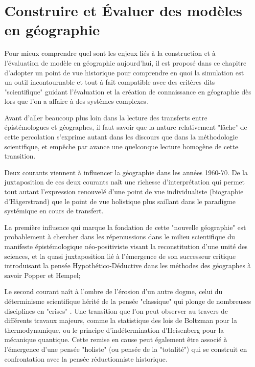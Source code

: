 


\chapter{Construire et Évaluer des modèles en géographie}

\startcontents[chapters]
\Mprintcontents

Pour mieux comprendre quel sont les enjeux liés à la construction et à l'évaluation de modèle en géographie aujourd'hui, il est proposé dans ce chapitre d'adopter un point de vue historique pour comprendre en quoi la simulation est un outil incontournable et tout à fait compatible avec des critères dits "scientifique" guidant l'évaluation et la création de connaissance en géographie dès lors que l'on a affaire à des systèmes complexes.

Avant d'aller beaucoup plus loin dans la lecture des transferts entre épistémologues et géographes, il faut savoir que la nature relativement "lâche" de cette percolation s'exprime autant dans les discours que dans la méthodologie scientifique, et empêche par avance une quelconque lecture homogène de cette transition.

Deux courants viennent à influencer la géographie dans les années 1960-70. De la juxtaposition de ces deux courants naît une richesse d’interprétation qui permet tout autant l'expression renouvelé d'une point de vue individualiste (biographie d'Hägerstrand) que le point de vue holistique plus saillant dans le paradigme systémique en cours de transfert. 

La première influence qui marque la fondation de cette "nouvelle géographie" est probablement à chercher dans les répercussions dans le milieu scientifique du manifeste épistémologique néo-positiviste visant la reconstitution d'une unité des sciences, et la quasi juxtaposition lié à l'émergence de son successeur critique introduisant la pensée Hypothético-Déductive dans les méthodes des géographes à savoir Popper et Hempel; 

Le second courant naît à l'ombre de l'érosion d'un autre dogme, celui du déterminisme scientifique hérité de la pensée "classique" qui plonge de nombreuses disciplines en "crises" \autocite[20-23]{Pouvreau2013}. Une transition que l'on peut observer au travers de différents travaux majeurs, comme la statistique des lois de Boltzman pour la thermodynamique, ou le principe d’indétermination d'Heisenberg pour la mécanique quantique. Cette remise en cause peut également être associé à l'émergence d'une pensée "holiste" (ou pensée de la "totalité") qui se construit en confrontation avec la pensée réductionniste historique. 

